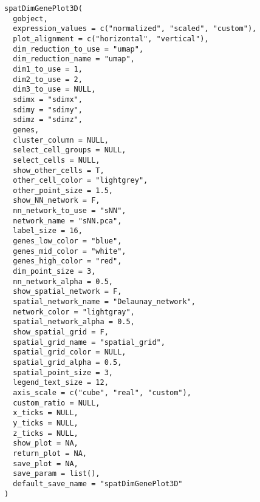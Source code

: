 \documentclass[a4paper]{book}
\begin{document}
\begin{Usage}
\begin{verbatim}
spatDimGenePlot3D(
  gobject,
  expression_values = c("normalized", "scaled", "custom"),
  plot_alignment = c("horizontal", "vertical"),
  dim_reduction_to_use = "umap",
  dim_reduction_name = "umap",
  dim1_to_use = 1,
  dim2_to_use = 2,
  dim3_to_use = NULL,
  sdimx = "sdimx",
  sdimy = "sdimy",
  sdimz = "sdimz",
  genes,
  cluster_column = NULL,
  select_cell_groups = NULL,
  select_cells = NULL,
  show_other_cells = T,
  other_cell_color = "lightgrey",
  other_point_size = 1.5,
  show_NN_network = F,
  nn_network_to_use = "sNN",
  network_name = "sNN.pca",
  label_size = 16,
  genes_low_color = "blue",
  genes_mid_color = "white",
  genes_high_color = "red",
  dim_point_size = 3,
  nn_network_alpha = 0.5,
  show_spatial_network = F,
  spatial_network_name = "Delaunay_network",
  network_color = "lightgray",
  spatial_network_alpha = 0.5,
  show_spatial_grid = F,
  spatial_grid_name = "spatial_grid",
  spatial_grid_color = NULL,
  spatial_grid_alpha = 0.5,
  spatial_point_size = 3,
  legend_text_size = 12,
  axis_scale = c("cube", "real", "custom"),
  custom_ratio = NULL,
  x_ticks = NULL,
  y_ticks = NULL,
  z_ticks = NULL,
  show_plot = NA,
  return_plot = NA,
  save_plot = NA,
  save_param = list(),
  default_save_name = "spatDimGenePlot3D"
)
\end{verbatim}
\end{Usage}
%
\end{document}
